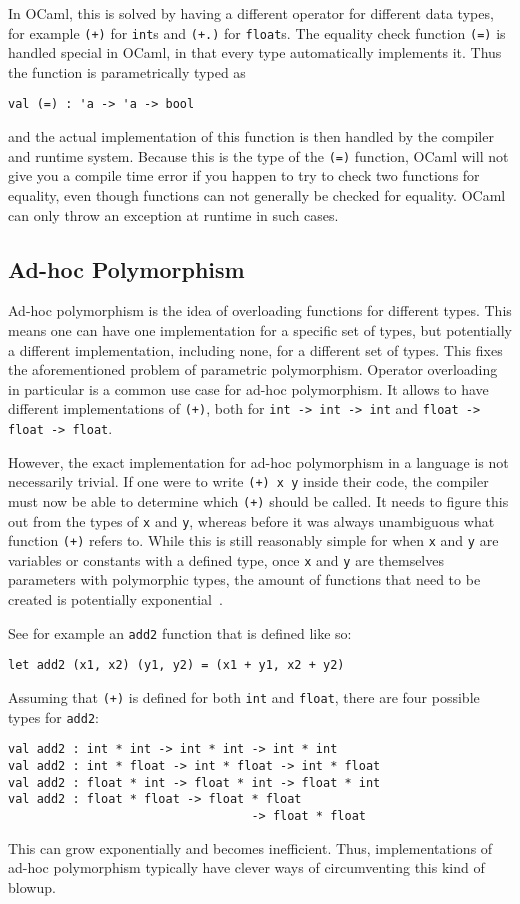 In OCaml, this is solved by having a different operator for different data types, for example \verb|(+)| for \verb|int|s and \verb|(+.)| for \verb|float|s. The equality check function \verb|(=)| is handled special in OCaml, in that every type automatically implements it. Thus the function is parametrically typed as
\begin{verbatim}
val (=) : 'a -> 'a -> bool
\end{verbatim}
and the actual implementation of this function is then handled by the compiler and runtime system. Because this is the type of the \verb|(=)| function, OCaml will not give you a compile time error if you happen to try to check two functions for equality, even though functions can not generally be checked for equality. OCaml can only throw an exception at runtime in such cases.

\subsection{Ad-hoc Polymorphism}

Ad-hoc polymorphism is the idea of overloading functions for different types. This means one can have one implementation for a specific set of types, but potentially a different implementation, including none, for a different set of types. This fixes the aforementioned problem of parametric polymorphism. Operator overloading in particular is a common use case for ad-hoc polymorphism. It allows to have different implementations of \verb|(+)|, both for \verb|int -> int -> int| and \verb|float -> float -> float|.

However, the exact implementation for ad-hoc polymorphism in a language is not necessarily trivial. If one were to write \verb|(+) x y| inside their code, the compiler must now be able to determine which \verb|(+)| should be called. It needs to figure this out from the types of \verb|x| and \verb|y|, whereas before it was always unambiguous what function \verb|(+)| refers to. While this is still reasonably simple for when \verb|x| and \verb|y| are variables or constants with a defined type, once \verb|x| and \verb|y| are themselves parameters with polymorphic types, the amount of functions that need to be created is potentially exponential~\cite{type-classes-original}.

See for example an \verb|add2| function that is defined like so:
\begin{verbatim}
let add2 (x1, x2) (y1, y2) = (x1 + y1, x2 + y2)
\end{verbatim}
Assuming that \verb|(+)| is defined for both \verb|int| and \verb|float|, there are four possible types for \verb|add2|:
\begin{verbatim}
val add2 : int * int -> int * int -> int * int
val add2 : int * float -> int * float -> int * float
val add2 : float * int -> float * int -> float * int
val add2 : float * float -> float * float
                                  -> float * float
\end{verbatim}
This can grow exponentially and becomes inefficient. Thus, implementations of ad-hoc polymorphism typically have clever ways of circumventing this kind of blowup.

